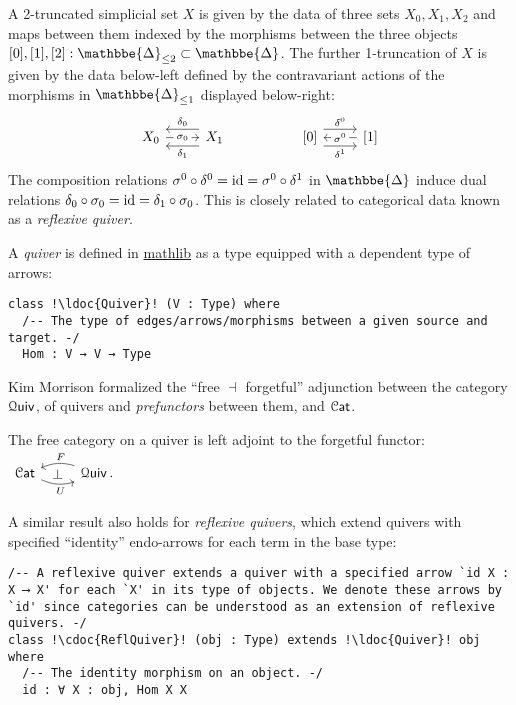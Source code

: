 \documentclass[a4paper,UKenglish,cleveref, autoref, thm-restate]{lipics-v2021}
\newcommand{\id}{\textup{id}}
\newcommand{\cat}[1]{\textup{\textsf{#1}}}%
\newcommand{\1}{\mathbbe{1}}
\newcommand{\2}{\mathbbe{2}}
\newcommand{\3}{\mathbbe{3}}
\newcommand{\DDelta}{\mathbbe{\Delta}}
\newcommand{\Cat}{\mathcal{C}\cat{at}}
\newcommand{\Quiv}{\mathcal{Q}\cat{uiv}}
\newcommand{\libmathlib}{\href{https://github.com/leanprover-community/mathlib}{\textsf{mathlib}}}
\newcommand{\ldoc}[2][]{\href{https://leanprover-community.github.io/mathlib4_docs/find/?pattern=#1#2\#doc}{\texttt{#2}}}
\newcommand{\cdoc}[2][]{\href{https://leanprover-community.github.io/mathlib4_docs/find/?pattern=CategoryTheory.#1#2\#doc}{\texttt{#2}}}
\begin{document}
A 2-truncated simplicial set $X$ is given by the data of three sets $X_0, X_1, X_2$ and maps between them indexed by the morphisms between the three objects $[0], [1], [2] : \DDelta_{\leq 2} \subset \DDelta$. The further 1-truncation of $X$  is given by the data below-left defined by the contravariant actions of the morphisms in $\DDelta_{\leq 1}$ displayed below-right:
\begin{equation}\label{eq:underlying-refl-quiv} \begin{tikzcd} X_0 \arrow[r, "\sigma_0" description] & X_1 \arrow[l, shift left=.6em, "\delta_1"] \arrow[l, shift right=.6em, "\delta_0"']  & & {[0]} \arrow[r, shift left=.6em, "\delta^0"] \arrow[r, shift right=.6em, "\delta^1"'] & {[1]} \arrow[l, "\sigma^0" description] \end{tikzcd}
\end{equation}
The composition relations    $\sigma^0 \circ \delta^0 = \id = \sigma^0 \circ \delta^1$ in $\DDelta$ induce dual relations $\delta_0 \circ \sigma_0 = \id = \delta_1 \circ \sigma_0$.  This is closely related to categorical data known as a \emph{reflexive quiver}.

A \emph{quiver} is defined in \libmathlib{} as a type equipped with a dependent type of arrows:
\begin{lstlisting}
class !\ldoc{Quiver}! (V : Type) where
  /-- The type of edges/arrows/morphisms between a given source and target. -/
  Hom : V → V → Type
\end{lstlisting}
Kim Morrison formalized the ``free $\dashv$ forgetful'' adjunction between the category $\Quiv$, of quivers and \emph{prefunctors} between them, and $\Cat$.

\begin{proposition}[\cdoc{Quiv.adj}]\label{prop:quiv-adj}
  The free category on a quiver is left adjoint to the forgetful functor:
  $ \begin{tikzcd} \Cat \arrow[r, bend right=20, "U"' pos=.6] \arrow[r, phantom, "\bot"] & \Quiv\,. \arrow[l, bend right=20, "F"' pos=.4] \end{tikzcd} $
\end{proposition}

A similar result also holds for \emph{reflexive quivers}, which extend quivers with specified ``identity'' endo-arrows for each term in the base type:
\begin{lstlisting}
/-- A reflexive quiver extends a quiver with a specified arrow `id X : X ⟶ X' for each `X' in its type of objects. We denote these arrows by `id' since categories can be understood as an extension of reflexive quivers. -/
class !\cdoc{ReflQuiver}! (obj : Type) extends !\ldoc{Quiver}! obj where
  /-- The identity morphism on an object. -/
  id : ∀ X : obj, Hom X X
\end{lstlisting}
\end{document}
